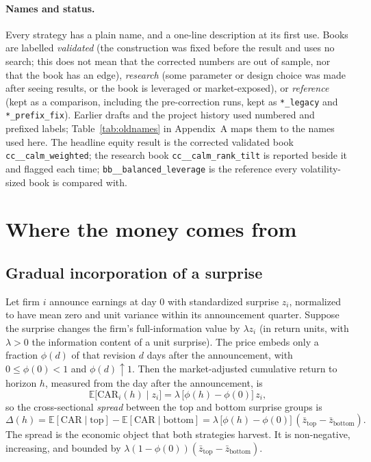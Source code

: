 \documentclass[11pt]{article}
\makeatletter
\theoremstyle{definition}
\newcommand{\E}{\mathbb{E}}
\newcommand{\1}{\mathbf{1}}
\newcommand{\sn}[1]{\texttt{\sn@scan#1\@nil}}
\def\sn@scan#1{\ifx#1\@nil\else\ifx#1_\_\allowbreak\else#1\fi\expandafter\sn@scan\fi}
\makeatother
\begin{document}
\paragraph{Names and status.}
Every strategy has a plain name, and a one-line description at its first use. Books are
labelled \emph{validated} (the construction was fixed before the result and uses no search; this does not mean that the corrected numbers are out of sample, nor that the book has an edge),
\emph{research} (some parameter or design choice was made after seeing results, or the book is
leveraged or market-exposed), or \emph{reference} (kept as a comparison, including the
pre-correction runs, kept as \texttt{*\_legacy} and \texttt{*\_prefix\_fix}). Earlier drafts and the project history used numbered and prefixed labels; Table~\ref{tab:oldnames} in Appendix~A maps them to the names used here.
The headline equity result is the corrected validated book \sn{calm_weighted}; the research book
\sn{calm_rank_tilt} is reported beside it and flagged each time; \sn{balanced_leverage} is the
reference every volatility-sized book is compared with.

\section{Where the money comes from}\label{sec:mechanism}

\subsection{Gradual incorporation of a surprise}

Let firm $i$ announce earnings at day $0$ with standardized surprise $z_i$, normalized to have mean
zero and unit variance within its announcement quarter. Suppose the surprise changes the firm's
full-information value by $\lambda z_i$ (in return units, with $\lambda>0$ the information content
of a unit surprise). The price embeds only a fraction $\phi(d)$ of that revision $d$ days after the
announcement, with $0\le\phi(0)<1$ and $\phi(d)\uparrow1$. Then the market-adjusted cumulative
return to horizon $h$, measured from the day after the announcement, is
\begin{equation}
  \E\big[\mathrm{CAR}_i(h)\mid z_i\big]=\lambda\,\big[\phi(h)-\phi(0)\big]\,z_i,
  \label{eq:drift}
\end{equation}
so the cross-sectional \emph{spread} between the top and bottom surprise groups is
\begin{equation}
  \Delta(h)=\E[\mathrm{CAR}\mid \text{top}]-\E[\mathrm{CAR}\mid\text{bottom}]
  =\lambda\,\big[\phi(h)-\phi(0)\big]\,(\bar z_{\text{top}}-\bar z_{\text{bottom}}).
  \label{eq:spread}
\end{equation}
The spread is the economic object that both strategies harvest. It is non-negative, increasing,
and bounded by $\lambda(1-\phi(0))(\bar z_{\text{top}}-\bar z_{\text{bottom}})$.
\end{document}
